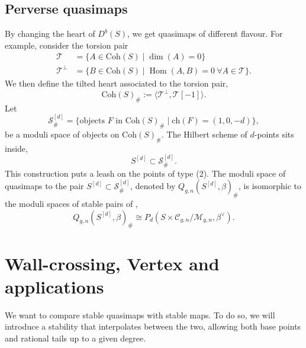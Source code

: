 \documentclass[11pt, reqno]{amsart}
\theoremstyle{plain}
\theoremstyle{definition}
\theoremstyle{remark}
\newcommand{\CC}{{\mathcal C}}
\newcommand{\CM}{{\mathcal M}}
\newcommand{\CS}{{\mathcal S}}
\newcommand{\CT}{{\mathcal T}}
\newcommand{\ch}{{\mathrm{ch}}}
\newcommand{\Cohc}{\mathrm{Coh}}
\newcommand\Hom{\operatorname{Hom}}
\begin{document}
\subsection{Perverse quasimaps}
By changing the heart of $D^b(S)$, we get  quasimaps of different flavour. For example, consider the torsion pair
\begin{align*}
\CT&=\{A \in \Cohc(S) \mid \dim(A)=0\}  \\
\CT^{\perp}&=\{B \in \Cohc(S) \mid \Hom(A,B)=0 \ \forall A \in \CT\}.
\end{align*}
We then define the tilted heart associated to the torsion pair, 
\[\Cohc(S)_{\#}:=\langle \CT^\perp, \CT[-1] \rangle.\]
Let
\[ \CS^{[d]}_{\#}=\{ \text{objects $F$ in  }\Cohc(S)_{\#} \mid  \ch(F)=(1,0,-d) \}, \] 
be a moduli space of objects on $\Cohc(S)_{\#}$. The Hilbert scheme of $d$-points sits inside, 
\[ S^{[d]} \subset \CS^{[d]}_{\#}.\]
This construction puts a leash on the points of type (2). The moduli space of quasimaps to the pair $S^{[d]} \subset \CS^{[d]}_{\#}$, denoted by $Q_{g,n}(S^{[d]},\beta)_{\#}$,  is isomorphic to the moduli spaces of stable pairs of \cite{PT}, 
\[Q_{g,n}(S^{[d]},\beta)_{\#} \cong P_d(S\times \CC_{g,n}/ \CM_{g,n},\beta^\vee).\]


\section{Wall-crossing, Vertex and applications}
We want to compare stable quasimaps with stable maps. To do so, we will introduce a stability that interpolates between the two, allowing both base points and rational tails up to a given degree. 
\end{document}
